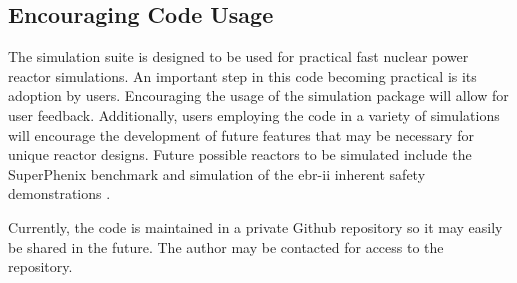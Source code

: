   \subsection{Encouraging Code Usage}
    The simulation suite is designed to be used for practical fast nuclear power
    reactor simulations. An important step in this code becoming practical is
    its adoption by users. Encouraging the usage of the simulation package will
    allow for user feedback. Additionally, users employing the code in a variety
    of simulations will encourage the development of future features that may be
    necessary for unique reactor designs. Future possible reactors to be
    simulated include the SuperPhenix benchmark and simulation of the
    \gls{ebr-ii} inherent safety demonstrations \cite{ebriitests}.
    
    \renewcommand{\thefootnote}{\fnsymbol{footnote}}
    Currently, the code is maintained in a private Github repository so it may 
    easily be shared in the future. The author may be contacted\footnotemark 
    for access to the repository. 



\glsresetall
